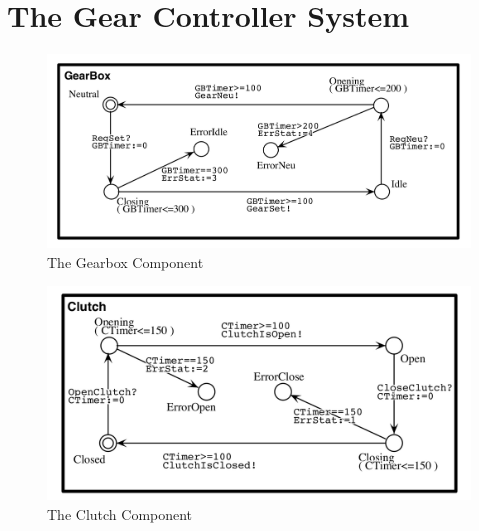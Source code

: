 \chapter{The Gear Controller System}
\label{ap1}


\begin{figure}[H]       
\centering            
\includegraphics[scale=0.25]{Figures/gbgb}
\caption{The Gearbox Component}
\label{fig:gbgb}         
\end{figure}  


\begin{figure}[H]       
\centering            
\includegraphics[scale=0.29]{Figures/gbc}
\caption{The Clutch Component}
\label{fig:gbc}         
\end{figure}  


